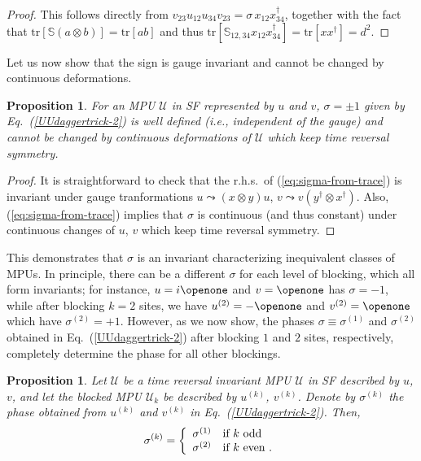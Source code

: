 \documentclass[pra,twocolumn,nofootinbib,superscriptaddress]{revtex4-1}
\newtheorem{prop}[thm]{Proposition}
\begin{document}
\begin{proof}
	This follows directly from $v_{23}u_{12}u_{34}v_{23}=\sigma\,
		x_{12}x_{34}^\dagger$, together with the fact that
	$\mathrm{tr}[\mathbb S(a\otimes b)]=\mathrm{tr}[ab]$ and thus
	$\mathrm{tr}[\mathbb
			S_{12,34}x_{12}x_{34}^\dagger]=\mathrm{tr}[xx^\dagger]=d^2$.
\end{proof}

Let us now show that the sign is gauge invariant and
cannot be changed by continuous deformations.

\begin{prop}
	\label{prop:sigma-well-defined}
	For an MPU $\mathcal U$ in SF represented by $u$ and $v$, $\sigma=\pm1$
	given by Eq.~(\ref{UUdaggertrick-2}) is well defined (i.e., independent
	of the gauge) and cannot be changed by continuous deformations of
	$\mathcal U$ which keep time reversal symmetry.
\end{prop}

\begin{proof}
	It is straightforward to check that  the r.h.s.\ of
	(\ref{eq:sigma-from-trace}) is invariant under gauge tranformations
	$u\leadsto(x\otimes y)u$, $v\leadsto v(y^\dagger\otimes x^\dagger)$.
	Also, (\ref{eq:sigma-from-trace}) implies that $\sigma$ is continuous (and
	thus constant) under continuous changes of $u$, $v$ which keep time
	reversal symmetry.
\end{proof}

This demonstrates that $\sigma$ is an invariant characterizing
inequivalent classes of MPUs.  In principle, there can be a different
$\sigma$ for each level of blocking, which all form invariants; for
instance, $u=i\openone$ and $v=\openone$ has $\sigma=-1$, while after
blocking $k=2$ sites, we have $u^{(2)}=-\openone$ and $v^{(2)}=\openone$
which have $\sigma^{(2)}=+1$. However, as we now show, the phases
$\sigma\equiv\sigma^{(1)}$ and $\sigma^{(2)}$ obtained in
Eq.~(\ref{UUdaggertrick-2}) after blocking $1$ and $2$ sites,
respectively, completely determine the phase for all other blockings.

\begin{prop}
	\label{prop:sigma1-and-sigma2-equal}
	Let $\mathcal U$ be a time reversal invariant MPU $\mathcal U$ in SF
	described by $u$, $v$, and let the blocked MPU $\mathcal U_k$ be described
	by $u^{(k)}$, $v^{(k)}$. Denote by $\sigma^{(k)}$ the phase obtained from
	$u^{(k)}$ and $v^{(k)}$ in Eq.~(\ref{UUdaggertrick-2}). Then,
	\[
		\sigma^{(k)} = \left\{\begin{array}{l@{\quad}l}
			\sigma^{(1)} & \mbox{if $k$ odd}     \\
			\sigma^{(2)} & \mbox{if $k$ even\ .}
		\end{array}\right.
	\]
\end{prop}
\end{document}
